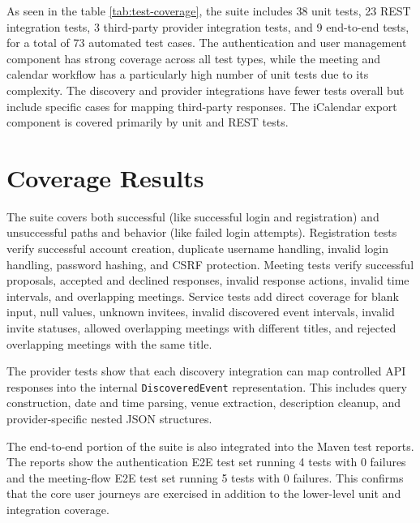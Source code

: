 As seen in the table \ref{tab:test-coverage}, the suite includes 38 unit tests, 23 REST integration tests, 3 third-party provider integration tests, and 9 end-to-end tests, for a total of 73 automated test cases. The authentication and user management component has strong coverage across all test types, while the meeting and calendar workflow has a particularly high number of unit tests due to its complexity. The discovery and provider integrations have fewer tests overall but include specific cases for mapping third-party responses. The iCalendar export component is covered primarily by unit and REST tests.

\section{Coverage Results}

The suite covers both successful (like successful login and registration) and unsuccessful paths and behavior (like failed login attempts). Registration tests verify successful account creation, duplicate username handling, invalid login handling, password hashing, and CSRF protection. Meeting tests verify successful proposals, accepted and declined responses, invalid response actions, invalid time intervals, and overlapping meetings. Service tests add direct coverage for blank input, null values, unknown invitees, invalid discovered event intervals, invalid invite statuses, allowed overlapping meetings with different titles, and rejected overlapping meetings with the same title.

The provider tests show that each discovery integration can map controlled API responses into the internal \texttt{DiscoveredEvent} representation. This includes query construction, date and time parsing, venue extraction, description cleanup, and provider-specific nested JSON structures.

The end-to-end portion of the suite is also integrated into the Maven test reports. The reports show the authentication E2E test set running 4 tests with 0 failures and the meeting-flow E2E test set running 5 tests with 0 failures. This confirms that the core user journeys are exercised in addition to the lower-level unit and integration coverage.
